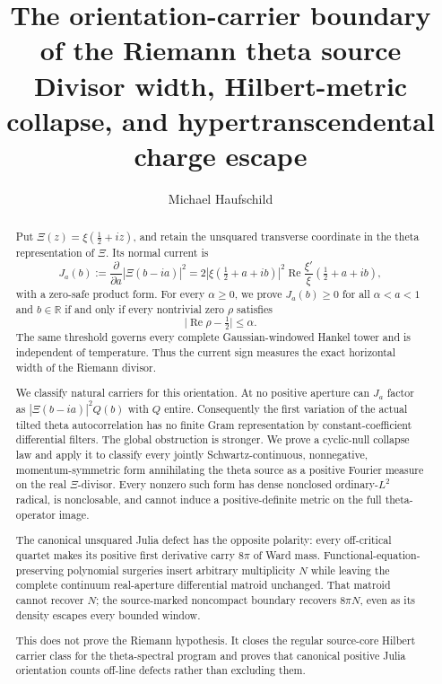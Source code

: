 \documentclass[11pt]{article}
\title{\textbf{The orientation-carrier boundary of the Riemann theta source}\\
\large Divisor width, Hilbert-metric collapse, and
hypertranscendental charge escape}
\author{Michael Haufschild}
\date{}
\theoremstyle{definition}
\theoremstyle{remark}
\newcommand{\R}{\mathbb R}
\newcommand{\Rea}{\operatorname{Re}}
\begin{document}
\maketitle

\begin{abstract}
Put \(\Xi(z)=\xi(\frac12+iz)\), and retain the unsquared transverse
coordinate in the theta representation of \(\Xi\).  Its normal current is
\[
  J_a(b):=\frac{\partial}{\partial a}|\Xi(b-ia)|^2
  =2|\xi(\tfrac12+a+ib)|^2
     \Rea\frac{\xi'}{\xi}(\tfrac12+a+ib),
\]
with a zero-safe product form.  For every \(\alpha\geq0\), we prove
\(J_a(b)\geq0\) for all \(\alpha<a<1\) and \(b\in\R\) if and only if
every nontrivial zero \(\rho\) satisfies
\[
  \big|\Rea\rho-\tfrac12\big|\leq\alpha.
\]
The same threshold governs every complete Gaussian-windowed Hankel tower
and is independent of temperature.  Thus the current sign measures the
exact horizontal width of the Riemann divisor.

We classify natural carriers for this orientation.  At no positive
aperture can \(J_a\) factor as
\(|\Xi(b-ia)|^2Q(b)\) with \(Q\) entire.  Consequently the first
variation of the actual tilted theta autocorrelation has no finite Gram
representation by constant-coefficient differential filters.  The
global obstruction is stronger.  We prove a cyclic-null collapse law and
apply it to classify every jointly Schwartz-continuous, nonnegative,
momentum-symmetric form annihilating the theta source as a positive
Fourier measure on the real \(\Xi\)-divisor.  Every nonzero such form has
dense nonclosed ordinary-\(L^2\) radical, is nonclosable, and cannot
induce a positive-definite metric on the full theta-operator image.

The canonical unsquared Julia defect has the opposite polarity: every
off-critical quartet makes its positive first derivative carry
\(8\pi\) of Ward mass.  Functional-equation-preserving polynomial
surgeries insert arbitrary multiplicity \(N\) while leaving the complete
continuum real-aperture differential matroid unchanged.  That matroid
cannot recover \(N\); the source-marked noncompact boundary recovers
\(8\pi N\), even as its density escapes every bounded window.

This does not prove the Riemann hypothesis.  It closes the regular
source-core Hilbert carrier class for the theta-spectral program and
proves that canonical positive Julia orientation counts off-line defects
rather than excluding them.
\end{abstract}
\end{document}
